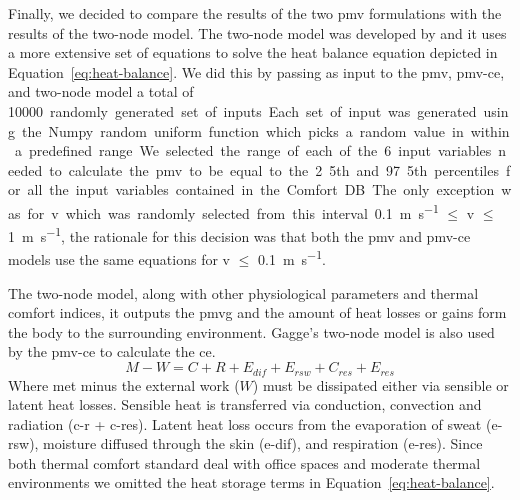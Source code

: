 Finally, we decided to compare the results of the two \ac{pmv} formulations with the results of the two-node model.
The two-node model was developed by  and it uses a more extensive set of equations to solve the heat balance equation depicted in Equation~\ref{eq:heat-balance}.
We did this by passing as input to the \ac{pmv}, \gls{pmv-ce}, and two-node model a total of \qty{10000} randomly generated set of inputs. 
Each set of input was generated using the Numpy random uniform function which picks a random value in within a predefined range. 
We selected the range of each of the 6 input variables needed to calculate the \ac{pmv} to be equal to the 2.5th and 97.5th percentiles for all the input variables contained in the Comfort DB.
The only exception was for \ac{v} which was randomly selected from this interval \qty{0.1}{\m\per\s} $\leq$ \ac{v} $\leq$ \qty{1}{\m\per\s}, the rationale for this decision was that both the \ac{pmv} and \gls{pmv-ce} models use the same equations for \ac{v} $\leq$ \qty{0.1}{\m\per\s}.

The two-node model, along with other physiological parameters and thermal comfort indices, it outputs the \gls{pmvg} and the amount of heat losses or gains form the body to the surrounding environment.
Gagge's two-node model is also used by the \gls{pmv-ce} to calculate the \ac{ce}.
\begin{equation}
    M - W = C + R + E_{dif} + E_{rsw} + C_{res} + E_{res}\label{eq:heat-balance}
\end{equation}
Where \ac{met} minus the external work ($W$) must be dissipated either via sensible or latent heat losses.
Sensible heat is transferred via conduction, convection and radiation (\ac{c-r} + \ac{c-res}).
Latent heat loss occurs from the evaporation of sweat (\ac{e-rsw}), moisture diffused through the skin  (\ac{e-dif}), and respiration (\ac{e-res}).
Since both thermal comfort standard deal with office spaces and moderate thermal environments we omitted the heat storage terms in Equation~\ref{eq:heat-balance}.

